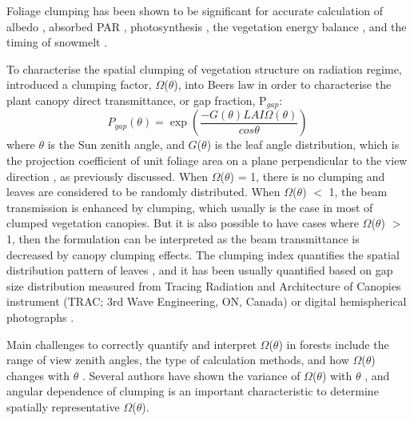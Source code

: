 Foliage clumping has been shown to be significant for accurate calculation of albedo \citep{Ni2000}, absorbed PAR \citep{Chen2008}, photosynthesis \citep{Law2001}, the vegetation energy balance \citep{Anderson2005}, and the timing of snowmelt \citep{Hardy1997}.

To characterise the spatial clumping of vegetation structure on radiation regime, \citet{Nilson1971} introduced a clumping factor, $\Omega$($\theta$), into Beer\textquotesingle s law in order to characterise the plant canopy direct transmittance, or gap fraction, P$_{gap}$:
\begin{equation}
 P_{gap}(\theta) = \exp{(\frac{-G(\theta)LAI\Omega(\theta)}{cos\theta})}
\end{equation}\label{eq:pgap}
\noindent where $\theta$ is the Sun zenith angle, and $G$($\theta$) is the leaf angle distribution, which is the projection coefficient of unit foliage area on a plane perpendicular to the view direction \citep{Ross1981}, as previously discussed. When $\Omega$($\theta$) = 1, there is no clumping and leaves are considered to be randomly distributed. When $\Omega$($\theta$) $<$ 1, the beam transmission is enhanced by clumping, which usually is the case in most of clumped vegetation canopies. But it is also possible to have cases where $\Omega$($\theta$) $>$ 1, then the formulation can be interpreted as the beam transmittance is decreased by canopy clumping effects.
The clumping index quantifies the spatial distribution pattern of leaves \citep{Norman1974}, and it has been usually quantified based on gap size distribution measured from Tracing Radiation and Architecture of Canopies instrument (TRAC; 3rd Wave Engineering, ON, Canada) \citep{Leblanc2002} or digital hemispherical photographs \citep{ChenandCihlar1995,Leblanc2005}. 

Main challenges to correctly quantify and interpret $\Omega$($\theta$) in forests include the range of view zenith angles, the type of calculation methods, and how $\Omega$($\theta$) changes with $\theta$ \citep{Ryu2010}. Several authors have shown the variance of $\Omega$($\theta$) with $\theta$ \citep{Andrieu1993,Chen1996,Kucharik1999,Chen2008}, and angular dependence of clumping is an important characteristic to determine spatially representative $\Omega$($\theta$). 

